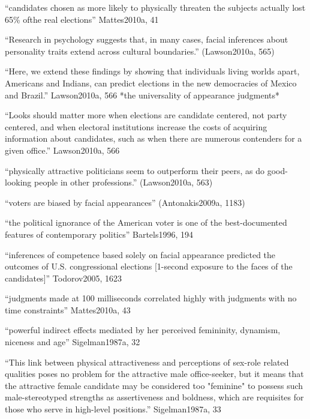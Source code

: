 		``candidates chosen as more likely to physically threaten the subjects actually lost 65\% ofthe real elections'' Mattes2010a, 41

		``Research in psychology suggests that, in many cases, facial inferences about personality traits extend across cultural boundaries.'' (Lawson2010a, 565)

		``Here, we extend these findings by showing that individuals living worlds apart, Americans and Indians, can predict elections in the new democracies of Mexico and Brazil.'' Lawson2010a, 566 *the universality of appearance judgments*

		``Looks should matter more when elections are candidate centered, not party centered, and when electoral institutions increase the costs of acquiring information about candidates, such as when there are numerous contenders for a given office.'' Lawson2010a, 566

		``physically attractive politicians seem to outperform their peers, as do good-looking people in other professions.'' (Lawson2010a, 563)

		``voters are biased by facial appearances'' (Antonakis2009a, 1183)

		``the political ignorance of the American voter is one of the best-documented features of contemporary politics'' Bartels1996, 194


	
		``inferences of competence based solely on facial appearance predicted the outcomes of U.S. congressional elections [1-second exposure to the faces of the candidates]'' Todorov2005, 1623

		``judgments made at 100 milliseconds correlated highly with judgments with no time constraints'' Mattes2010a, 43









``powerful indirect effects mediated by her perceived femininity, dynamism, niceness and age'' Sigelman1987a, 32

``This link between physical attractiveness and perceptions of sex-role related qualities poses no problem for the attractive male office-seeker, but it means that the attractive female candidate may be considered too "feminine" to possess such male-stereotyped strengths as assertiveness and boldness, which are requisites for those who serve in high-level positions.''  Sigelman1987a, 33

